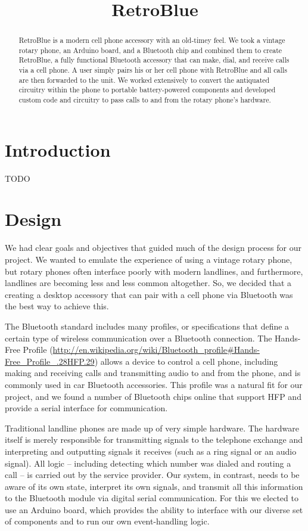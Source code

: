 \documentclass{es50report}
\title{RetroBlue}
\begin{document}
    \maketitlepage

    \begin{abstract}
        RetroBlue is a modern cell phone accessory with an old-timey feel. We took a vintage rotary phone, an Arduino board, and a Bluetooth chip and combined them to create RetroBlue, a fully functional Bluetooth accessory that can make, dial, and receive calls via a cell phone. A user simply pairs his or her cell phone with RetroBlue and all calls are then forwarded to the unit. We worked extensively to convert the antiquated circuitry within the phone to portable battery-powered components and developed custom code and circuitry to pass calls to and from the rotary phone's hardware.
    \end{abstract}
    \newpage
    \doublespacing

    \section{Introduction}
    TODO

    \section{Design}
        We had clear goals and objectives that guided much of the design process for our project. We wanted to emulate the experience of using a vintage rotary phone, but rotary phones often interface poorly with modern landlines, and furthermore, landlines are becoming less and less common altogether. So, we decided that a creating a desktop accessory that can pair with a cell phone via Bluetooth was the best way to achieve this.
        
        The Bluetooth standard includes many profiles, or specifications that define a certain type of wireless communication over a Bluetooth connection. The Hands-Free Profile (\url{http://en.wikipedia.org/wiki/Bluetooth_profile#Hands-Free_Profile_.28HFP.29}) allows a device to control a cell phone, including making and receiving calls and transmitting audio to and from the phone, and is commonly used in car Bluetooth accessories. This profile was a natural fit for our project, and we found a number of Bluetooth chips online that support HFP and provide a serial interface for communication.
        
        Traditional landline phones are made up of very simple hardware. The hardware itself is merely responsible for transmitting signals to the telephone exchange and interpreting and outputting signals it receives (such as a ring signal or an audio signal). All logic -- including detecting which number was dialed and routing a call -- is carried out by the service provider. Our system, in contrast, needs to be aware of its own state, interpret its own signals, and transmit all this information to the Bluetooth module via digital serial communication. For this we elected to use an Arduino board, which provides the ability to interface with our diverse set of components and to run our own event-handling logic.
\end{document}
